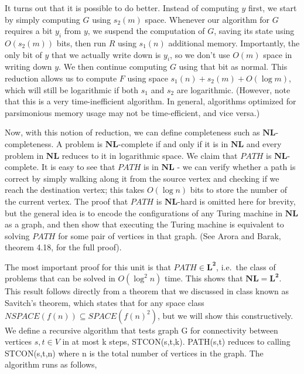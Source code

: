 \documentclass[10pt]{article}
\theoremstyle{definition}
\begin{document}
It turns out that it is possible to do better.  Instead of computing $y$ first, we start by simply computing $G$ using $s_2(m)$ space.  Whenever our algorithm for $G$ requires a bit $y_i$ from $y$, we suspend the computation of $G$, saving its state using $O(s_2(m))$ bits, then run $R$ using $s_1(n)$ additional memory.  Importantly, the only bit of $y$ that we actually write down is $y_i$, so we don't use $O(m)$ space in writing down $y$.  We then continue computing $G$ using that bit as normal.  This reduction allows us to compute $F$ using space $s_1(n) + s_2(m) + O(\log m)$, which will still be logarithmic if both $s_1$ and $s_2$ are logarithmic.  (However, note that this is a very time-inefficient algorithm.  In general, algorithms optimized for parsimonious memory usage may not be time-efficient, and vice versa.)

Now, with this notion of reduction, we can define completeness such as $\mathbf{NL}$-completeness.  A problem is $\mathbf{NL}$-complete if and only if it is in $\mathbf{NL}$ and every problem in $\mathbf{NL}$ reduces to it in logarithmic space.  We claim that $PATH$ is $\mathbf{NL}$-complete.  It is easy to see that $PATH$ is in $\mathbf{NL}$ - we can verify whether a path is correct by simply walking along it from the source vertex and checking if we reach the destination vertex; this takes $O(\log n)$ bits to store the number of the current vertex.  The proof that $PATH$ is $\mathbf{NL}$-hard is omitted here for brevity, but the general idea is to encode the configurations of any Turing machine in $\mathbf{NL}$ as a graph, and then show that executing the Turing machine is equivalent to solving $PATH$ for some pair of vertices in that graph.  (See Arora and Barak, theorem 4.18, for the full proof).

The most important proof for this unit is that $PATH \in \mathbf{L^2}$, i.e.\ the class of problems that can be solved in $O(\log^2 n)$ time.  This shows that $\mathbf{NL} = \mathbf{L^2}$. This result follows directly from a theorem that we discussed in class known as Savitch's theorem, which states that for any space class $NSPACE(f(n)) \subseteq SPACE(f(n)^2)$, but we will show this constructively. We define a recursive algorithm that tests graph G for connectivity between vertices $s,t \in V$ in at most k steps, STCON(s,t,k). PATH(s,t) reduces to calling STCON(s,t,n) where n is the total number of vertices in the graph. The algorithm runs as follows,
\end{document}

